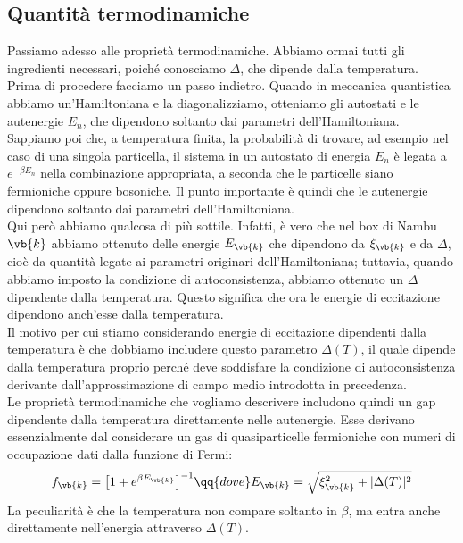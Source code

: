 \subsection{Quantità termodinamiche}
Passiamo adesso alle proprietà termodinamiche. Abbiamo ormai tutti gli ingredienti necessari, poiché conosciamo $\Delta$, che dipende dalla temperatura.\\
Prima di procedere facciamo un passo indietro. Quando in meccanica quantistica abbiamo un'Hamiltoniana e la diagonalizziamo, otteniamo gli autostati e le autenergie $E_n$, che dipendono soltanto dai parametri dell'Hamiltoniana. Sappiamo poi che, a temperatura finita, la probabilità di trovare, ad esempio nel caso di una singola particella, il sistema in un autostato di energia $E_n$ è legata a $e^{-\beta E_n}$ nella combinazione appropriata, a seconda che le particelle siano fermioniche oppure bosoniche. Il punto importante è quindi che le autenergie dipendono soltanto dai parametri dell'Hamiltoniana.\\
Qui però abbiamo qualcosa di più sottile. Infatti, è vero che nel box di Nambu $\vb{k}$ abbiamo ottenuto delle energie $E_{\vb{k}}$ che dipendono da $\xi_{\vb{k}}$ e da $\Delta$, cioè da quantità legate ai parametri originari dell'Hamiltoniana; tuttavia, quando abbiamo imposto la condizione di autoconsistenza, abbiamo ottenuto un $\Delta$ dipendente dalla temperatura. Questo significa che ora le energie di eccitazione dipendono anch'esse dalla temperatura.\\
Il motivo per cui stiamo considerando energie di eccitazione dipendenti dalla temperatura è che dobbiamo includere questo parametro $\Delta(T)$, il quale dipende dalla temperatura proprio perché deve soddisfare la condizione di autoconsistenza derivante dall'approssimazione di campo medio introdotta in precedenza.\\
Le proprietà termodinamiche che vogliamo descrivere includono quindi un gap dipendente dalla temperatura direttamente nelle autenergie. Esse derivano essenzialmente dal considerare un gas di quasiparticelle fermioniche con numeri di occupazione dati dalla funzione di Fermi:
\begin{equation*}
   f_{\vb{k}}
   =\bigl[ 1+e^{\beta E_{\vb{k}}} \bigr]^{-1}
   \qq{dove}
   E_{\vb{k}}
   =
   \sqrt{ \xi_{\vb{k}}^2 + |\Delta(T)|^2 }
\end{equation*}
La peculiarità è che la temperatura non compare soltanto in $\beta$, ma entra anche direttamente nell'energia attraverso $\Delta(T)$.\\
